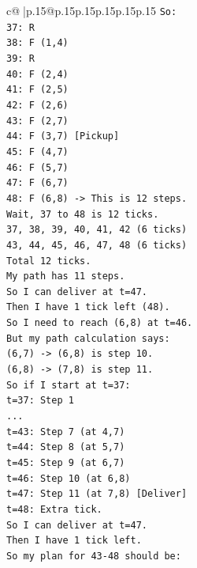 \documentclass{article}
\begin{document}
{\begin{supertabular}{c@{$\;$}|p{.15\linewidth}@{}p{.15\linewidth}p{.15\linewidth}p{.15\linewidth}p{.15\linewidth}p{.15\linewidth}}
{{{\texttt{So:} \\
\texttt{37: R} \\
\texttt{38: F (1,4)} \\
\texttt{39: R} \\
\texttt{40: F (2,4)} \\
\texttt{41: F (2,5)} \\
\texttt{42: F (2,6)} \\
\texttt{43: F (2,7)} \\
\texttt{44: F (3,7) {[}Pickup{]}} \\
\texttt{45: F (4,7)} \\
\texttt{46: F (5,7)} \\
\texttt{47: F (6,7)} \\
\texttt{48: F (6,8) {-}> This is 12 steps.} \\
\texttt{Wait, 37 to 48 is 12 ticks.} \\
\texttt{37, 38, 39, 40, 41, 42 (6 ticks)} \\
\texttt{43, 44, 45, 46, 47, 48 (6 ticks)} \\
\texttt{Total 12 ticks.} \\
\texttt{My path has 11 steps.} \\
\texttt{So I can deliver at t=47.} \\
\texttt{Then I have 1 tick left (48).} \\
\texttt{So I need to reach (6,8) at t=46.} \\
\texttt{But my path calculation says:} \\
\texttt{(6,7) {-}> (6,8) is step 10.} \\
\texttt{(6,8) {-}> (7,8) is step 11.} \\
\texttt{So if I start at t=37:} \\
\texttt{t=37: Step 1} \\
\texttt{...} \\
\texttt{t=43: Step 7 (at 4,7)} \\
\texttt{t=44: Step 8 (at 5,7)} \\
\texttt{t=45: Step 9 (at 6,7)} \\
\texttt{t=46: Step 10 (at 6,8)} \\
\texttt{t=47: Step 11 (at 7,8) {[}Deliver{]}} \\
\texttt{t=48: Extra tick.} \\
\texttt{So I can deliver at t=47.} \\
\texttt{Then I have 1 tick left.} \\
\texttt{So my plan for 43{-}48 should be:} \\
}}}
\end{supertabular}}
\end{document}
